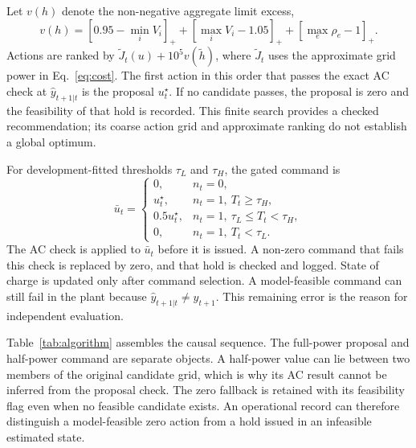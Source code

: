 \documentclass[preprint,12pt]{elsarticle}
\newcommand{\pos}[1]{[#1]_{+}}
\begin{document}
Let $v(h)$ denote the non-negative aggregate limit excess,
\begin{equation}
v(h)=\pos{0.95-\min_i V_i}+\pos{\max_i V_i-1.05}
+\pos{\max_e\rho_e-1}.\label{eq:severity}
\end{equation}
Actions are ranked by $\widetilde J_t(u)+10^5v(\widetilde h)$, where $\widetilde J_t$ uses the approximate grid power in Eq.~\eqref{eq:cost}. The first action in this order that passes the exact AC check at $\widehat y_{t+1|t}$ is the proposal $u_t^\star$. If no candidate passes, the proposal is zero and the feasibility of that hold is recorded. This finite search provides a checked recommendation; its coarse action grid and approximate ranking do not establish a global optimum.

For development-fitted thresholds $\tau_L$ and $\tau_H$, the gated command is
\begin{equation}
\bar u_t=\begin{cases}
0,&n_t=0,\\
u_t^\star,&n_t=1,\ T_t\geq\tau_H,\\
0.5u_t^\star,&n_t=1,\ \tau_L\leq T_t<\tau_H,\\
0,&n_t=1,\ T_t<\tau_L.
\end{cases}\label{eq:regimes}
\end{equation}
The AC check is applied to $\bar u_t$ before it is issued. A non-zero command that fails this check is replaced by zero, and that hold is checked and logged. State of charge is updated only after command selection. A model-feasible command can still fail in the plant because $\widehat y_{t+1|t}\ne y_{t+1}$. This remaining error is the reason for independent evaluation.

Table~\ref{tab:algorithm} assembles the causal sequence. The full-power proposal and half-power command are separate objects. A half-power value can lie between two members of the original candidate grid, which is why its AC result cannot be inferred from the proposal check. The zero fallback is retained with its feasibility flag even when no feasible candidate exists. An operational record can therefore distinguish a model-feasible zero action from a hold issued in an infeasible estimated state.
\end{document}
